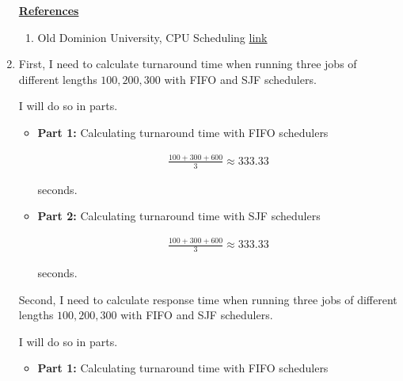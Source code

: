 \documentclass[12pt]{article}
\begin{document}
\begin{enumerate}[1.]
    \bigskip

    \underline{\textbf{References}}

    \begin{enumerate}[1)]
        \item Old Dominion University, CPU Scheduling \href{https://www.cs.odu.edu/~price/cs471/public_html/spring17/lectures/Scheduling.htm#:~:text=Response%20time%20%E2%80%93%20amount%20of%20time,the%20first%20response%20is%20produced.&text=Associate%20with%20each%20process%20the%20length%20of%20its%20next%20CPU%20burst.&text=Each%20process%20gets%20a%20small,%2C%20usually%2010%2D100%20milliseconds.}{link}
    \end{enumerate}

    \item

    First, I need to calculate turnaround time when running three jobs of different lengths
    $100, 200, 300$ with FIFO and SJF schedulers.

    \bigskip

    I will do so in parts.

    \begin{itemize}
        \item \textbf{Part 1:} Calculating turnaround time with FIFO schedulers

        \begin{align}
            \frac{100 + 300 + 600}{3} \approx 333.33
        \end{align}

        seconds.

        \item \textbf{Part 2:} Calculating turnaround time with SJF schedulers

        \begin{align}
            \frac{100 + 300 + 600}{3} \approx 333.33
        \end{align}

        seconds.
    \end{itemize}

    \bigskip

    Second, I need to calculate response time when running three jobs of different lengths
    $100, 200, 300$ with FIFO and SJF schedulers.

    \bigskip

    I will do so in parts.

    \bigskip

    \begin{itemize}
        \item \textbf{Part 1:} Calculating turnaround time with FIFO schedulers


\end{itemize}
\end{enumerate}
\end{document}
